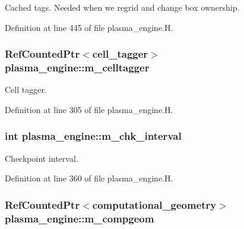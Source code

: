Cached tags. Needed when we regrid and change box ownership. 



Definition at line 445 of file plasma\+\_\+engine.\+H.

\subsubsection[{\texorpdfstring{m\+\_\+celltagger}{m_celltagger}}]{\setlength{\rightskip}{0pt plus 5cm}Ref\+Counted\+Ptr$<${\bf cell\+\_\+tagger}$>$ plasma\+\_\+engine\+::m\+\_\+celltagger\hspace{0.3cm}{\ttfamily [protected]}}\hypertarget{classplasma__engine_aa461442fa00ec1752e3947baae8c9762}{}\label{classplasma__engine_aa461442fa00ec1752e3947baae8c9762}


Cell tagger. 



Definition at line 305 of file plasma\+\_\+engine.\+H.

\subsubsection[{\texorpdfstring{m\+\_\+chk\+\_\+interval}{m_chk_interval}}]{\setlength{\rightskip}{0pt plus 5cm}int plasma\+\_\+engine\+::m\+\_\+chk\+\_\+interval\hspace{0.3cm}{\ttfamily [protected]}}\hypertarget{classplasma__engine_aeb4e9f7e160f2b7cbd62571e4fbd4573}{}\label{classplasma__engine_aeb4e9f7e160f2b7cbd62571e4fbd4573}


Checkpoint interval. 



Definition at line 360 of file plasma\+\_\+engine.\+H.

\subsubsection[{\texorpdfstring{m\+\_\+compgeom}{m_compgeom}}]{\setlength{\rightskip}{0pt plus 5cm}Ref\+Counted\+Ptr$<${\bf computational\+\_\+geometry}$>$ plasma\+\_\+engine\+::m\+\_\+compgeom\hspace{0.3cm}{\ttfamily [protected]}}\hypertarget{classplasma__engine_a40573f0fdf8bba99f48842dbf8ccefc8}{}\label{classplasma__engine_a40573f0fdf8bba99f48842dbf8ccefc8}


